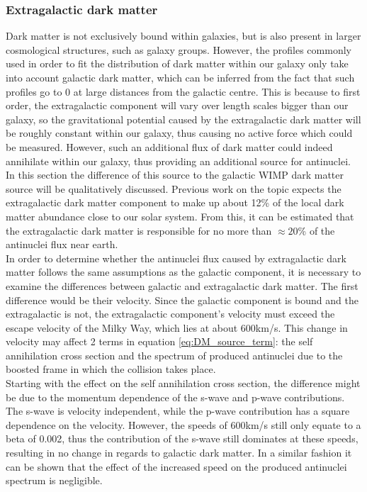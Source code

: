 \subsubsection{Extragalactic dark matter}
Dark matter is not exclusively bound within galaxies, but is also present in larger cosmological structures, such as galaxy groups\cite{}. However, the profiles commonly used in order to fit the distribution of dark matter within our galaxy only take into account galactic dark matter, which can be inferred from the fact that such profiles go to 0 at large distances from the galactic centre. This is because to first order, the extragalactic component will vary over length scales bigger than our galaxy, so the gravitational potential caused by the extragalactic dark matter will be roughly constant within our galaxy, thus causing no active force which could be measured. However, such an additional flux of dark matter could indeed annihilate within our galaxy, thus providing an additional source for antinuclei. In this section the difference of this source to the galactic WIMP dark matter source will be qualitatively discussed. Previous work on the topic expects the extragalactic dark matter component to make up about 12\% of the local dark matter abundance close to our solar system\cite{}. From this, it can be estimated that the extragalactic dark matter is responsible for no more than $\approx 20$\% of the antinuclei flux near earth. \\ 

In order to determine whether the antinuclei flux caused by extragalactic dark matter follows the same assumptions as the galactic component, it is necessary to examine the differences between galactic and extragalactic dark matter. The first difference would be their velocity. Since the galactic component is bound and the extragalactic is not, the extragalactic component's velocity must exceed the escape velocity of the Milky Way, which lies at about 600km/s. This change in velocity may affect 2 terms in equation \ref{eq:DM_source_term}: the self annihilation cross section and the spectrum of produced antinuclei due to the boosted frame in which the collision takes place. \\
Starting with the effect on the self annihilation cross section, the difference might be due to the momentum dependence of the s-wave and p-wave contributions. The s-wave is velocity independent, while the p-wave contribution has a square dependence on the velocity. However, the speeds of 600km/s still only equate to a beta of 0.002, thus the contribution of the s-wave still dominates at these speeds, resulting in no change in regards to galactic dark matter. In a similar fashion it can be shown that the effect of the increased speed on the produced antinuclei spectrum is negligible. \\


